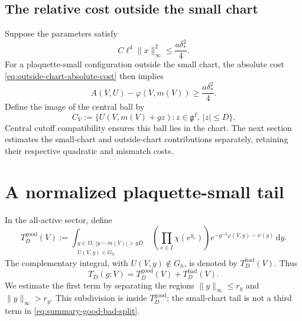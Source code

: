 \documentclass[10pt,reqno]{amsart}
\theoremstyle{definition}
\theoremstyle{remark}
\numberwithin{equation}{section}
\numberwithin{figure}{section}
\newcommand{\g}{\mathfrak g}
\newcommand{\dd}{\mathrm d}
\begin{document}
\subsection{The relative cost outside the small chart}
Suppose the parameters satisfy
\begin{equation}\label{eq:coarse-energy-smallness}
C\ell^4\|x\|_\infty^2\le\frac{a\delta_*^2}{4}.
\end{equation}
For a plaquette-small configuration outside the small chart, the absolute
cost \eqref{eq:outside-chart-absolute-cost} then implies
\begin{equation}\label{eq:outside-chart-relative-cost}
A(V,U)-\varphi(V,m(V))\ge\frac{a\delta_*^2}{4}.
\end{equation}
Define the image of the central ball by
\begin{equation}\label{eq:central-group-region}
C_V:=\{U(V,m(V)+gz):z\in\g^I,\ |z|\le D\}.
\end{equation}
Central cutoff compatibility ensures this ball lies in the chart.
The next section estimates the small-chart and outside-chart
contributions separately, retaining their respective quadratic and
mismatch costs.

\section{A normalized plaquette-small tail}\label{sec:normalized-good-tail}
In the all-active sector, define
\begin{equation}\label{eq:plaquette-small-tail-definition}
T_D^{\mathrm{good}}(V):=
\int_{\substack{y\in\Omega,\ |y-m(V)|>gD\\U(V,y)\in G_h}}
\left(\prod_{e\in I}\chi(e^{y_e})\right)
e^{-g^{-2}\varphi(V,y)-\psi(y)}\,\dd y.
\end{equation}
The complementary integral, with $U(V,y)\notin G_h$, is denoted by
$T_D^{\mathrm{bad}}(V)$. Thus
\begin{equation}\label{eq:summary-good-bad-split}
T_D(g;V)=T_D^{\mathrm{good}}(V)+T_D^{\mathrm{bad}}(V).
\end{equation}
We estimate the first term by separating the regions
$\|y\|_\infty\le r_y$ and $\|y\|_\infty>r_y$. This subdivision is
inside $T_D^{\mathrm{good}}$; the small-chart tail is not a third
term in \eqref{eq:summary-good-bad-split}.
\end{document}

